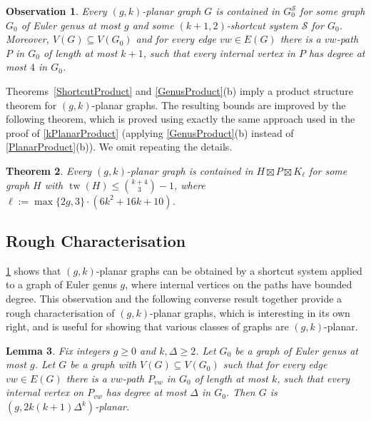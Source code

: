 \documentclass{patmorin}
\theoremstyle{plain}
\newtheorem{thm}{Theorem}
\newtheorem{lem}[thm]{Lemma}
\newtheorem{obs}[thm]{Observation}
\theoremstyle{definition}
\newcommand{\note}[2]{\noindent{\color{red}[#1:~#2]}}
\DeclareMathOperator{\tw}{tw}
\renewcommand{\SS}{\mathcal{S}}
\renewcommand{\geq}{\geqslant}
\renewcommand{\leq}{\leqslant}
\begin{document}
\begin{obs}
\label{gAddDummy}
Every $(g,k)$-planar graph $G$ is contained in $G_0^\SS$ for some graph $G_0$ of Euler genus at most $g$ and some $(k+1,2)$-shortcut system $\SS$ for $G_0$. Moreover, $V(G) \subseteq V(G_0)$ and for every edge $vw \in E(G)$ there is a $vw$-path $P$ in $G_0$ of length at most $k+1$, such that every internal vertex in $P$ has degree at most $4$ in $G_0$.
\end{obs}

Theorems~\ref{ShortcutProduct}  and \ref{GenusProduct}(b) imply a product structure theorem for $(g,k)$-planar graphs. The resulting bounds are improved by the following theorem, which is proved using exactly the same approach used in the proof of \cref{kPlanarProduct} (applying \cref{GenusProduct}(b) instead of \cref{PlanarProduct}(b)). We omit repeating the details.

\begin{thm}
\label{gkPlanarProduct}
Every $(g,k)$-planar graph is contained in $H\boxtimes P \boxtimes K_\ell$ for some graph $H$ with $\tw(H) \leq \binom{k+4}{3}-1$, where $\ell:=\max\{2g,3\}\cdot(6k^2+16k+10)$.
\end{thm}






\subsection{Rough Characterisation}
\label{Characterisation}

\cref{gAddDummy} shows that $(g,k)$-planar graphs can be obtained by a shortcut system applied to a graph of Euler genus $g$, where internal vertices on the paths have bounded degree. This observation and the following converse result together provide a rough characterisation of $(g,k)$-planar graphs, which is interesting in its own right, and is useful for showing that various classes of graphs are $(g,k)$-planar.

\begin{lem}
	\label{DrawG}
	Fix integers $g\geq 0$ and $k,\Delta\geq 2$.
	Let $G_0$ be a graph of Euler genus at most $g$. Let $G$ be
	a graph with $V(G) \subseteq V(G_0)$ such that for every edge $vw \in
	E(G)$ there is a $vw$-path $P_{vw}$ in $G_0$ of length at most $k$, such
	that every internal vertex on $P_{vw}$ has degree at most $\Delta$ in
	$G_0$. Then $G$ is $(g, 2k(k+1)\Delta^{k} )$-planar.
\end{lem}
\end{document}
